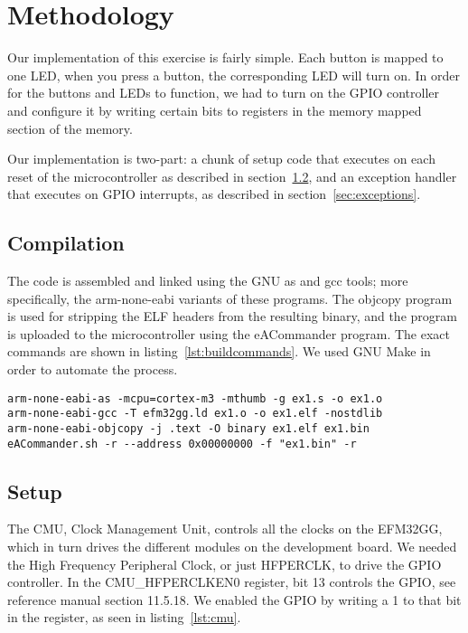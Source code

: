\chapter{Methodology}
Our implementation of this exercise is fairly simple. Each button is mapped to one LED, when you press a button, the corresponding LED will turn on. In order for the buttons and LEDs to function, we had to turn on the GPIO controller and configure it by writing certain bits to registers in the memory mapped section of the memory.

Our implementation is two-part: a chunk of setup code that executes on each reset of the microcontroller as described in section~\ref{sec:setup}, and an exception handler that executes on GPIO interrupts, as described in section~\ref{sec:exceptions}.

\section{Compilation}
The code is assembled and linked using the GNU as and gcc tools; more specifically, the arm-none-eabi variants of these programs. The objcopy program is used for stripping the ELF headers from the resulting binary, and the program is uploaded to the microcontroller using the eACommander program. The exact commands are shown in listing~\ref{lst:buildcommands}. We used GNU Make in order to automate the process.

\begin{lstlisting}[label=lst:buildcommands, caption=Commands used to build and upload code.]
arm-none-eabi-as -mcpu=cortex-m3 -mthumb -g ex1.s -o ex1.o
arm-none-eabi-gcc -T efm32gg.ld ex1.o -o ex1.elf -nostdlib
arm-none-eabi-objcopy -j .text -O binary ex1.elf ex1.bin
eACommander.sh -r --address 0x00000000 -f "ex1.bin" -r
\end{lstlisting}

\section{Setup}
\label{sec:setup}
The CMU, Clock Management Unit, controls all the clocks on the EFM32GG, which in turn drives the different modules on the development board. We needed the High Frequency Peripheral Clock, or just HFPERCLK, to drive the GPIO controller. In the CMU\_HFPERCLKEN0 register, bit 13 controls the GPIO, see reference manual\cite{efm32ggrm} section 11.5.18. We enabled the GPIO by writing a 1 to that bit in the register, as seen in listing~\ref{lst:cmu}.

